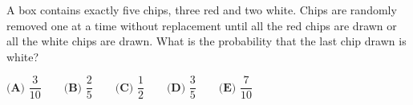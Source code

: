 A box contains exactly five chips, three red and two white. Chips are randomly removed one at a time without replacement until all the red chips are drawn or all the white chips are drawn. What is the probability that the last chip drawn is white?

$\textbf{(A) } \dfrac{3}{10}\qquad\textbf{(B) } \dfrac{2}{5}\qquad\textbf{(C) } \dfrac{1}{2}\qquad\textbf{(D) } \dfrac{3}{5}\qquad\textbf{(E) } \dfrac{7}{10}$
